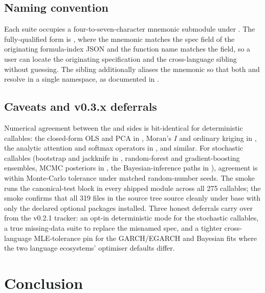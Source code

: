 \documentclass[article,shortnames,nojss]{jss}
\begin{document}
\subsection{Naming convention}\label{sec:textbook-naming}

Each suite occupies a four-to-seven-character mnemonic submodule
under .  The  fully-qualified
form is , where the
mnemonic matches the spec  field of the originating
formula-index JSON and the function name matches the
 field, so a user can locate the originating
specification and the cross-language sibling without guessing.  The  sibling additionally aliases the
mnemonic so that both  and
 resolve in a single namespace,
as documented in \citet{Ruhela2026MorieR}.

\subsection{Caveats and v0.3.x deferrals}\label{sec:textbook-caveats}

Numerical agreement between the  and
 sides is bit-identical for deterministic callables:
the closed-form OLS and PCA in , Moran's
$I$ and ordinary kriging in , the analytic
attention and softmax operators in , and similar.  For stochastic callables
(bootstrap and jackknife in , random-forest
and gradient-boosting ensembles, MCMC posteriors in
, the Bayesian-inference paths in
), agreement is within Monte-Carlo
tolerance under matched random-number seeds.  The
 smoke runs the  canonical-test
block in every shipped module across all 275 callables; the
 smoke confirms that all 319  files in the
source tree source cleanly under base  with only the
declared  optional packages installed.  Three
honest deferrals carry over from the v0.2.1 tracker: an opt-in
deterministic mode for the stochastic callables, a true
missing-data suite to replace the misnamed 
spec, and a tighter cross-language MLE-tolerance pin for the
GARCH/EGARCH and Bayesian fits where the two language
ecosystems' optimiser defaults differ.

\section{Conclusion}
\label{sec:conclusion}
\end{document}
